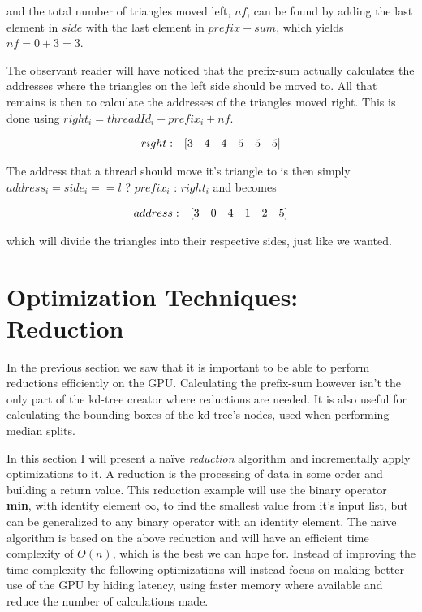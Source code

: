 and the total number of triangles moved left, $nf$, can be found by
adding the last element in $side$ with the last element in $prefix-sum$,
which yields $nf = 0 + 3 = 3$.

The observant reader will have noticed that the prefix-sum actually
calculates the addresses where the triangles on the left side should
be moved to. All that remains is then to calculate the addresses of
the triangles moved right. This is done using $right_i = threadId_i -
prefix_i + nf$.

\begin{displaymath}
  \begin{array} {r r r r r r r}
    right: & [3 & 4 & 4 & 5 & 5 & 5]
  \end{array}
\end{displaymath}

The address that a thread should move it's triangle to is then simply
$address_i = side_i == l$ ? $prefix_i$ : $right_i$ and becomes


\begin{displaymath}
  \begin{array} {r r r r r r r}
    address: & [3 & 0 & 4 & 1 & 2 & 5]
  \end{array}
\end{displaymath}

which will divide the triangles into their respective sides, just like
we wanted.




\section{Optimization Techniques: Reduction}\label{sec:reduce}


In the previous section we saw that it is important to be able to
perform reductions efficiently on the GPU. Calculating the prefix-sum
however isn't the only part of the kd-tree creator where reductions
are needed. It is also useful for calculating the bounding boxes of
the kd-tree's nodes, used when performing median splits.

In this section I will present a naïve \textit{reduction} algorithm
and incrementally apply optimizations to it. A reduction is the
processing of data in some order and building a return value. This
reduction example will use the binary operator \textbf{min}, with
identity element $\infty$, to find the smallest value from it's input
list, but can be generalized to any binary operator with an identity
element. The naïve algorithm is based on the above reduction and will
have an efficient time complexity of $O(n)$, which is the best we can
hope for. Instead of improving the time complexity the following
optimizations will instead focus on making better use of the GPU by
hiding latency, using faster memory where available and reduce the
number of calculations made.

